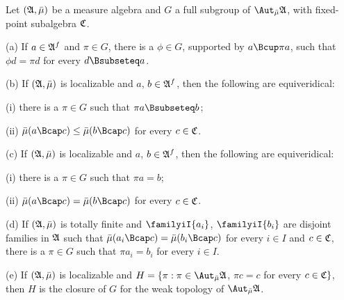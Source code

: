 
 Let $(\frak A,\bar\mu)$ be a
measure algebra and $G$ a full subgroup of $\AmuA$, with fixed-point
subalgebra $\frak C$.

(a) If $a\in\frak A^f$ and $\pi\in G$, there is a
$\phi\in G$, supported by
$a\Bcup\pi a$, such that $\phi d=\pi d$ for every $d\Bsubseteq a$.

(b) If $(\frak A,\bar\mu)$ is localizable
and $a$, $b\in\frak A^f$, then the following are equiveridical:

\quad(i) there is a $\pi\in G$ such that $\pi a\Bsubseteq b$;

\quad(ii) $\bar\mu(a\Bcap c)\le\bar\mu(b\Bcap c)$ for every $c\in\frak C$.

(c) If $(\frak A,\bar\mu)$ is localizable
and $a$, $b\in\frak A^f$, then the following are equiveridical:

\quad(i) there is a $\pi\in G$ such that $\pi a=b$;

\quad(ii) $\bar\mu(a\Bcap c)=\bar\mu(b\Bcap c)$ for every $c\in\frak C$.

(d) If $(\frak A,\bar\mu)$ is totally finite
and $\familyiI{a_i}$,
$\familyiI{b_i}$ are disjoint families in $\frak A$ such that
$\bar\mu(a_i\Bcap c)=\bar\mu(b_i\Bcap c)$ for every $i\in I$ and
$c\in\frak C$, there is a $\pi\in G$ such that $\pi a_i=b_i$ for every
$i\in I$.

(e) If $(\frak A,\bar\mu)$ is localizable and
$H=\{\pi:\pi\in\AmuA$, $\pi c=c$ for every $c\in\frak C\}$,
then $H$ is the closure of $G$ for the weak topology of $\AmuA$.

